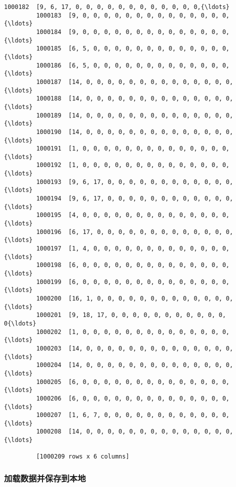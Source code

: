 \documentclass[11pt]{article}
\begin{document}
\begin{Verbatim}[commandchars=\\\{\}]
         1000182  [9, 6, 17, 0, 0, 0, 0, 0, 0, 0, 0, 0, 0, 0, 0,{\ldots}  
         1000183  [9, 0, 0, 0, 0, 0, 0, 0, 0, 0, 0, 0, 0, 0, 0, {\ldots}  
         1000184  [9, 0, 0, 0, 0, 0, 0, 0, 0, 0, 0, 0, 0, 0, 0, {\ldots}  
         1000185  [6, 5, 0, 0, 0, 0, 0, 0, 0, 0, 0, 0, 0, 0, 0, {\ldots}  
         1000186  [6, 5, 0, 0, 0, 0, 0, 0, 0, 0, 0, 0, 0, 0, 0, {\ldots}  
         1000187  [14, 0, 0, 0, 0, 0, 0, 0, 0, 0, 0, 0, 0, 0, 0,{\ldots}  
         1000188  [14, 0, 0, 0, 0, 0, 0, 0, 0, 0, 0, 0, 0, 0, 0,{\ldots}  
         1000189  [14, 0, 0, 0, 0, 0, 0, 0, 0, 0, 0, 0, 0, 0, 0,{\ldots}  
         1000190  [14, 0, 0, 0, 0, 0, 0, 0, 0, 0, 0, 0, 0, 0, 0,{\ldots}  
         1000191  [1, 0, 0, 0, 0, 0, 0, 0, 0, 0, 0, 0, 0, 0, 0, {\ldots}  
         1000192  [1, 0, 0, 0, 0, 0, 0, 0, 0, 0, 0, 0, 0, 0, 0, {\ldots}  
         1000193  [9, 6, 17, 0, 0, 0, 0, 0, 0, 0, 0, 0, 0, 0, 0,{\ldots}  
         1000194  [9, 6, 17, 0, 0, 0, 0, 0, 0, 0, 0, 0, 0, 0, 0,{\ldots}  
         1000195  [4, 0, 0, 0, 0, 0, 0, 0, 0, 0, 0, 0, 0, 0, 0, {\ldots}  
         1000196  [6, 17, 0, 0, 0, 0, 0, 0, 0, 0, 0, 0, 0, 0, 0,{\ldots}  
         1000197  [1, 4, 0, 0, 0, 0, 0, 0, 0, 0, 0, 0, 0, 0, 0, {\ldots}  
         1000198  [6, 0, 0, 0, 0, 0, 0, 0, 0, 0, 0, 0, 0, 0, 0, {\ldots}  
         1000199  [6, 0, 0, 0, 0, 0, 0, 0, 0, 0, 0, 0, 0, 0, 0, {\ldots}  
         1000200  [16, 1, 0, 0, 0, 0, 0, 0, 0, 0, 0, 0, 0, 0, 0,{\ldots}  
         1000201  [9, 18, 17, 0, 0, 0, 0, 0, 0, 0, 0, 0, 0, 0, 0{\ldots}  
         1000202  [1, 0, 0, 0, 0, 0, 0, 0, 0, 0, 0, 0, 0, 0, 0, {\ldots}  
         1000203  [14, 0, 0, 0, 0, 0, 0, 0, 0, 0, 0, 0, 0, 0, 0,{\ldots}  
         1000204  [14, 0, 0, 0, 0, 0, 0, 0, 0, 0, 0, 0, 0, 0, 0,{\ldots}  
         1000205  [6, 0, 0, 0, 0, 0, 0, 0, 0, 0, 0, 0, 0, 0, 0, {\ldots}  
         1000206  [6, 0, 0, 0, 0, 0, 0, 0, 0, 0, 0, 0, 0, 0, 0, {\ldots}  
         1000207  [1, 6, 7, 0, 0, 0, 0, 0, 0, 0, 0, 0, 0, 0, 0, {\ldots}  
         1000208  [14, 0, 0, 0, 0, 0, 0, 0, 0, 0, 0, 0, 0, 0, 0,{\ldots}  
         
         [1000209 rows x 6 columns]
\end{Verbatim}
            
    \subsubsection{加载数据并保存到本地}\label{ux52a0ux8f7dux6570ux636eux5e76ux4fddux5b58ux5230ux672cux5730}
\end{document}
